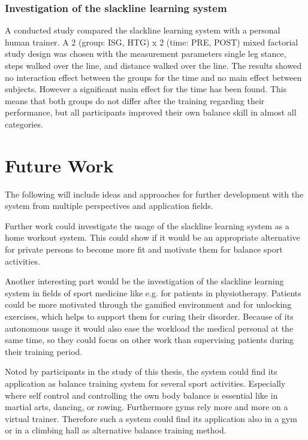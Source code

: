 \subsubsection{Investigation of the slackline learning system}
A conducted study compared the slackline learning system with a personal human trainer.
A 2 (group: ISG, HTG) x 2 (time: PRE, POST) mixed factorial study design was chosen with the measurement parameters single leg stance, steps walked over the line, and distance walked over the line.
The results showed no interaction effect between the groups for the time and no main effect between subjects.
However a significant main effect for the time has been found.
This means that both groups do not differ after the training regarding their performance, but all participants improved their own balance skill in almost all categories.

\section{Future Work}
The following will include ideas and approaches for further development with the system from multiple perspectives and application fields.

Further work could investigate the usage of the slackline learning system as a home workout system.
This could show if it would be an appropriate alternative for private persons to become more fit and motivate them for balance sport activities.

Another interesting part would be the investigation of the slackline learning system in fields of sport medicine like e.g. for patients in physiotherapy.
Patients could be more motivated through the gamified environment and for unlocking exercises, which helps to support them for curing their disorder.
Because of its autonomous usage it would also ease the workload the medical personal at the same time, so they could focus on other work than supervising patients during their training period.

Noted by participants in the study of this thesis, the system could find its application as balance training system for several sport activities.
Especially where self control and controlling the own body balance is essential like in martial arts, dancing, or rowing.
Furthermore gyms rely more and more on a virtual trainer.
Therefore such a system could find its application also in a gym or in a climbing hall as alternative balance training method.

